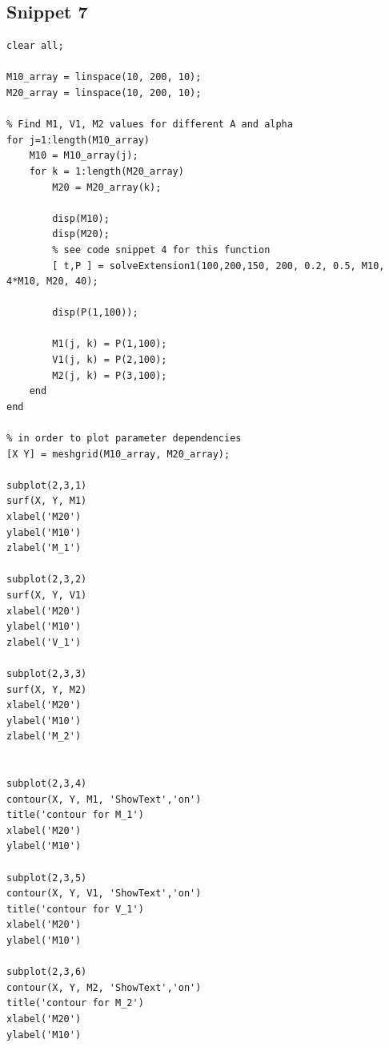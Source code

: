 \documentclass[12pt]{article}
\begin{document}
\subsection{Snippet 7}
\begin{verbatim}
clear all;

M10_array = linspace(10, 200, 10);
M20_array = linspace(10, 200, 10);

% Find M1, V1, M2 values for different A and alpha
for j=1:length(M10_array)
    M10 = M10_array(j);
    for k = 1:length(M20_array)
        M20 = M20_array(k);
        
        disp(M10);
        disp(M20);
        % see code snippet 4 for this function
        [ t,P ] = solveExtension1(100,200,150, 200, 0.2, 0.5, M10, 4*M10, M20, 40);
      
        disp(P(1,100));
        
        M1(j, k) = P(1,100);
        V1(j, k) = P(2,100);
        M2(j, k) = P(3,100);
    end 
end

% in order to plot parameter dependencies
[X Y] = meshgrid(M10_array, M20_array);

subplot(2,3,1)
surf(X, Y, M1)
xlabel('M20')
ylabel('M10')
zlabel('M_1')

subplot(2,3,2)
surf(X, Y, V1)
xlabel('M20')
ylabel('M10')
zlabel('V_1')

subplot(2,3,3)
surf(X, Y, M2)
xlabel('M20')
ylabel('M10')
zlabel('M_2')


subplot(2,3,4)
contour(X, Y, M1, 'ShowText','on')
title('contour for M_1')
xlabel('M20')
ylabel('M10')

subplot(2,3,5)
contour(X, Y, V1, 'ShowText','on')
title('contour for V_1')
xlabel('M20')
ylabel('M10')

subplot(2,3,6)
contour(X, Y, M2, 'ShowText','on')
title('contour for M_2')
xlabel('M20')
ylabel('M10')

\end{verbatim}
\end{document}
